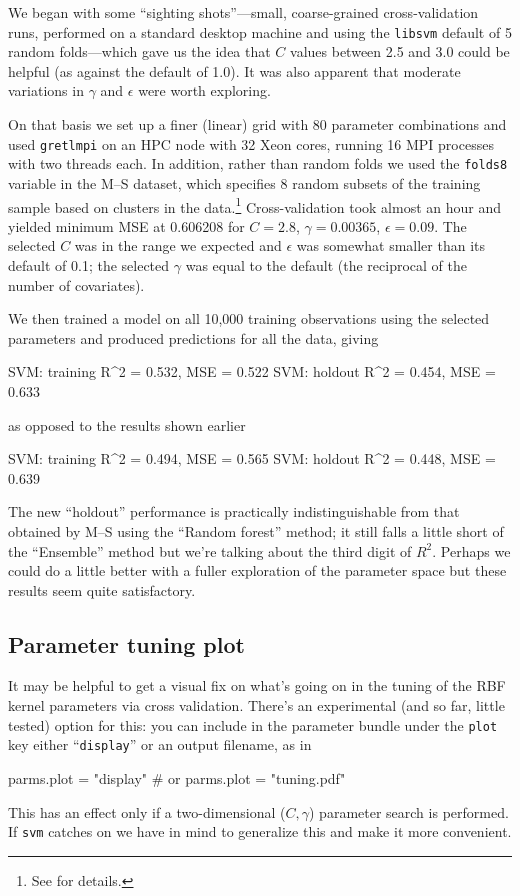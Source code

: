 \documentclass{article}
\begin{document}
We began with some ``sighting shots''---small, coarse-grained
cross-validation runs, performed on a standard desktop machine and
using the \texttt{libsvm} default of 5 random folds---which gave us
the idea that $C$ values between 2.5 and 3.0 could be helpful (as
against the default of 1.0). It was also apparent that moderate
variations in $\gamma$ and $\epsilon$ were worth exploring.

On that basis we set up a finer (linear) grid with 80 parameter
combinations and used \texttt{gretlmpi} on an HPC node with 32 Xeon
cores, running 16 MPI processes with two threads each. In addition,
rather than random folds we used the \texttt{folds8} variable in the
M--S dataset, which specifies 8 random subsets of the training sample
based on clusters in the data.\footnote{See \cite{mull-spiess-17a} for
  details.}  Cross-validation took almost an hour and yielded minimum
MSE at 0.606208 for $C=2.8$, $\gamma=0.00365$, $\epsilon=0.09$. The
selected $C$ was in the range we expected and $\epsilon$ was somewhat
smaller than its default of 0.1; the selected $\gamma$ was equal to
the default (the reciprocal of the number of covariates).

We then trained a model on all 10,000 training observations using the
selected parameters and produced predictions for all the data, giving
\begin{code}
SVM: training R^2 = 0.532, MSE = 0.522
SVM: holdout  R^2 = 0.454, MSE = 0.633
\end{code}
as opposed to the results shown earlier
\begin{code}
SVM: training R^2 = 0.494, MSE = 0.565
SVM: holdout  R^2 = 0.448, MSE = 0.639
\end{code}
The new ``holdout'' performance is practically indistinguishable from
that obtained by M--S using the ``Random forest'' method; it still falls
a little short of the ``Ensemble'' method but we're talking about the
third digit of $R^2$. Perhaps we could do a little better with a
fuller exploration of the parameter space but these results seem
quite satisfactory.

\subsection{Parameter tuning plot}
\label{sec:plot}

It may be helpful to get a visual fix on what's going on in the tuning
of the RBF kernel parameters via cross validation. There's an
experimental (and so far, little tested) option for this: you can
include in the parameter bundle under the \texttt{plot} key either
``\texttt{display}'' or an output filename, as in
\begin{code}
parms.plot = "display"
# or
parms.plot = "tuning.pdf"
\end{code}
This has an effect only if a two-dimensional ($C, \gamma$) parameter
search is performed. If \texttt{svm} catches on we have in mind to
generalize this and make it more convenient.
\end{document}
